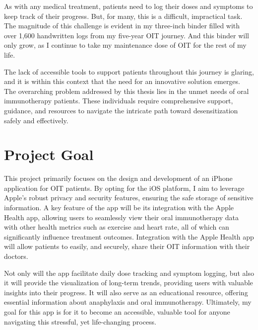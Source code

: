 As with any medical treatment, patients need to log their doses and symptoms to keep track of their progress. But, for many, this is a difficult, impractical task. The magnitude of this challenge is evident in my three-inch binder filled with over 1,600 handwritten logs from my five-year OIT journey. And this binder will only grow, as I continue to take my maintenance dose of OIT for the rest of my life.\par
The lack of accessible tools to support patients throughout this journey is glaring, and it is within this context that the need for an innovative solution emerges. The overarching problem addressed by this thesis lies in the unmet needs of oral immunotherapy patients. These individuals require comprehensive support, guidance, and resources to navigate the intricate path toward desensitization safely and effectively. 

\section{Project Goal}

This project primarily focuses on the design and development of an iPhone application for OIT patients. By opting for the iOS platform, I aim to leverage Apple's robust privacy and security features, ensuring the safe storage of sensitive information. A key feature of the app will be its integration with the Apple Health app, allowing users to seamlessly view their oral immunotherapy data with other health metrics such as exercise and heart rate, all of which can significantly influence treatment outcomes. Integration with the Apple Health app will allow patients to easily, and securely, share their OIT information with their doctors. \par
Not only will the app facilitate daily dose tracking and symptom logging, but also it will provide the visualization of long-term trends, providing users with valuable insights into their progress. It will also serve as an educational resource, offering essential information about anaphylaxis and oral immunotherapy. Ultimately, my goal for this app is for it to become an accessible, valuable tool for anyone navigating this stressful, yet life-changing process.\par    

